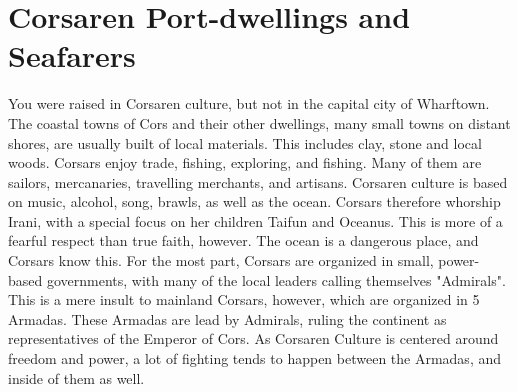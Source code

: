 \section{Corsaren Port-dwellings and Seafarers}\label{culture:corsarSeaside}
You were raised in Corsaren culture, but not in the capital city of Wharftown.
The coastal towns of Cors and their other dwellings, many small towns on distant shores, are usually built of local materials.
This includes clay, stone and local woods.
Corsars enjoy trade, fishing, exploring, and fishing.
Many of them are sailors, mercanaries, travelling merchants, and artisans.
Corsaren culture is based on music, alcohol, song, brawls, as well as the ocean.
Corsars therefore whorship Irani, with a special focus on her children Taifun and Oceanus.
This is more of a fearful respect than true faith, however.
The ocean is a dangerous place, and Corsars know this.
For the most part, Corsars are organized in small, power-based governments, with many of the local leaders calling themselves "Admirals".
This is a mere insult to mainland Corsars, however, which are organized in 5 Armadas.
These Armadas are lead by Admirals, ruling the continent as representatives of the Emperor of Cors.
As Corsaren Culture is centered around freedom and power, a lot of fighting tends to happen between the Armadas, and inside of them as well.